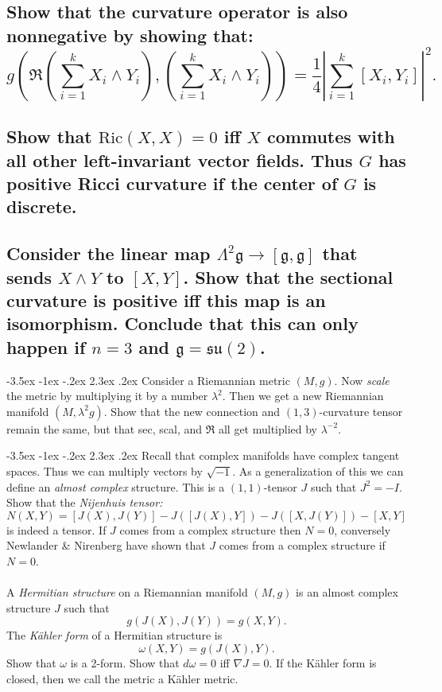 \documentclass[10pt]{article}
\makeatletter
\renewcommand\section{\@startsection{section}{1}{\z@}%
                                  {-3.5ex \@plus -1ex \@minus -.2ex}%
                                  {2.3ex \@plus.2ex}%
                                  {\normalfont\large\bfseries}}
\newcommand{\ric}{\mbox{Ric}}
\makeatother
\begin{document}
\subsection{Show that the curvature operator is also nonnegative by showing that: $$g \left( \mathfrak{R}\left( \sum_{i=1}^k X_i \wedge Y_i \right) , \left( \sum_{i=1}^k X_i \wedge Y_i \right) \right) = \frac{1}{4} \left| \sum_{i=1}^k [X_i, Y_i ] \right|^2 .$$}
\subsection{Show that $\ric(X,X) =0$ iff $X$ commutes with all other left-invariant vector fields. Thus $G$ has positive Ricci curvature if the center of $G$ is discrete.}
\subsection{Consider the linear map $\Lambda^2 \mathfrak{g} \to [\mathfrak{g} , \mathfrak{g}]$ that sends $X \wedge Y$ to $[X,Y]$. Show that the sectional curvature is positive iff this map is an isomorphism. Conclude that this can only happen if $n=3$ and $\mathfrak{g} = \mathfrak{su} (2)$.}


\section{Consider a Riemannian metric $(M,g)$. Now \emph{scale} the metric by multiplying it by a number $\lambda^2$. Then we get  a new Riemannian manifold $(M, \lambda^2 g)$. Show that the new connection and $(1,3)$-curvature tensor remain the same, but that sec, scal, and $\mathfrak{R}$ all get multiplied by $\lambda^{-2}$.}

\section{Recall that complex manifolds have complex tangent spaces. Thus we can multiply vectors by $\sqrt {-1}$. As a generalization of this we can define an \emph{almost complex} structure. This is a $(1,1)$-tensor $J$ such that $J^2 =-I$. Show that the \emph{Nijenhuis tensor:} $$N(X,Y) = [J(X), J(Y)] - J([J(X),Y])- J([X,J(Y)]) - [X,Y]$$ is indeed a tensor. If $J$ comes from a complex structure then $N=0$, conversely Newlander \& Nirenberg have shown that $J$ comes from a complex structure if $N=0$.\\\\A \emph{Hermitian  structure} on a Riemannian manifold $(M,g)$ is an almost complex structure $J$ such that $$g(J(X), J(Y)) = g(X,Y).$$ The \emph{K\"ahler form} of a Hermitian structure is $$\omega(X,Y) = g(J(X),Y).$$ Show that $\omega$ is a 2-form. Show that $d \omega =0$ iff $\nabla J=0$. If the K\"ahler form is closed, then we call the metric a K\"ahler metric.}
\end{document}
